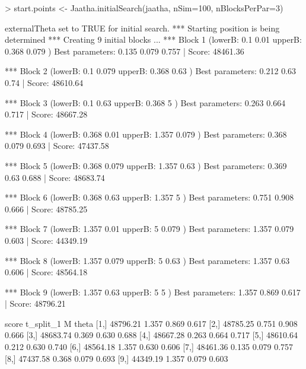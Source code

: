 
\begin{Schunk}
\begin{Sinput}
> start.points <- Jaatha.initialSearch(jaatha, nSim=100, nBlocksPerPar=3)
\end{Sinput}
\begin{Soutput}
externalTheta set to TRUE for initial search. 
*** Starting position is being determined *** 
Creating 9 initial blocks ...  
*** Block 1  (lowerB: 0.1 0.01  upperB: 0.368 0.079 ) 
Best parameters:  0.135 0.079 0.757 | Score: 48461.36 

*** Block 2  (lowerB: 0.1 0.079  upperB: 0.368 0.63 ) 
Best parameters:  0.212 0.63 0.74 | Score: 48610.64 

*** Block 3  (lowerB: 0.1 0.63  upperB: 0.368 5 ) 
Best parameters:  0.263 0.664 0.717 | Score: 48667.28 

*** Block 4  (lowerB: 0.368 0.01  upperB: 1.357 0.079 ) 
Best parameters:  0.368 0.079 0.693 | Score: 47437.58 

*** Block 5  (lowerB: 0.368 0.079  upperB: 1.357 0.63 ) 
Best parameters:  0.369 0.63 0.688 | Score: 48683.74 

*** Block 6  (lowerB: 0.368 0.63  upperB: 1.357 5 ) 
Best parameters:  0.751 0.908 0.666 | Score: 48785.25 

*** Block 7  (lowerB: 1.357 0.01  upperB: 5 0.079 ) 
Best parameters:  1.357 0.079 0.603 | Score: 44349.19 

*** Block 8  (lowerB: 1.357 0.079  upperB: 5 0.63 ) 
Best parameters:  1.357 0.63 0.606 | Score: 48564.18 

*** Block 9  (lowerB: 1.357 0.63  upperB: 5 5 ) 
Best parameters:  1.357 0.869 0.617 | Score: 48796.21 

         score t_split_1     M theta
 [1,] 48796.21     1.357 0.869 0.617
 [2,] 48785.25     0.751 0.908 0.666
 [3,] 48683.74     0.369 0.630 0.688
 [4,] 48667.28     0.263 0.664 0.717
 [5,] 48610.64     0.212 0.630 0.740
 [6,] 48564.18     1.357 0.630 0.606
 [7,] 48461.36     0.135 0.079 0.757
 [8,] 47437.58     0.368 0.079 0.693
 [9,] 44349.19     1.357 0.079 0.603
\end{Soutput}
\end{Schunk}

